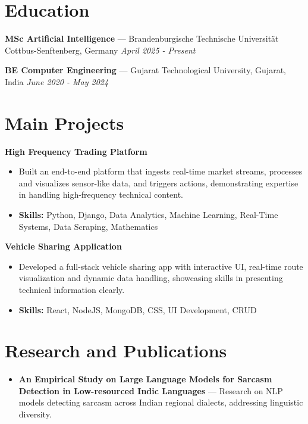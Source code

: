 \documentclass[a4paper,10pt]{article}
\begin{document}
\section*{Education}
\textbf{MSc Artificial Intelligence} — Brandenburgische Technische Universität Cottbus-Senftenberg, Germany \hfill \textit{April 2025 - Present}\par
\vspace{1.5pt}
\textbf{BE Computer Engineering} — Gujarat Technological University, Gujarat, India \hfill \textit{June 2020 - May 2024}\par

\section*{Main Projects}
\textbf{High Frequency Trading Platform}\par
\vspace{1pt}
\begin{itemize}
  \item Built an end-to-end platform that ingests real-time market streams, processes and visualizes sensor-like data, and triggers actions, demonstrating expertise in handling high-frequency technical content.
  \item \textbf{Skills:} Python, Django, Data Analytics, Machine Learning, Real-Time Systems, Data Scraping, Mathematics
\end{itemize}
\vspace{3pt}
\textbf{Vehicle Sharing Application}\par
\vspace{1pt}
\begin{itemize}
  \item Developed a full-stack vehicle sharing app with interactive UI, real-time route visualization and dynamic data handling, showcasing skills in presenting technical information clearly.
  \item \textbf{Skills:} React, NodeJS, MongoDB, CSS, UI Development, CRUD
\end{itemize}

\section*{Research and Publications}
\begin{itemize}
\item \textbf{An Empirical Study on Large Language Models for Sarcasm Detection in Low-resourced Indic Languages} — Research on NLP models detecting sarcasm across Indian regional dialects, addressing linguistic diversity.
\end{itemize}
\end{document}

